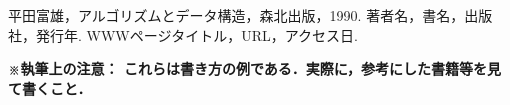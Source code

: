 \begin{thebibliography}{99}
   平田富雄，アルゴリズムとデータ構造，森北出版，1990.
   著者名，書名，出版社，発行年.
   WWWページタイトル，URL，アクセス日.
\end{thebibliography}
\textbf{\small ※執筆上の注意：
      これらは書き方の例である．実際に，参考にした書籍等を見て書くこと．\\}


